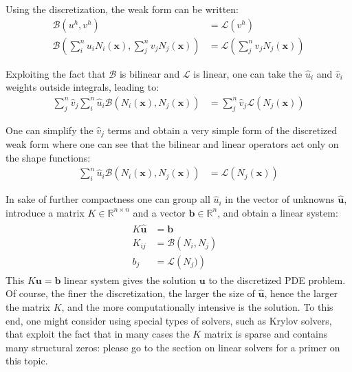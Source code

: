 \documentclass{digitaldynamics}
\def\vect#1{\bm{#1}}
\def\matr#1{{#1}}
\begin{document}
Using the discretization, the weak form can be written:
\begin{align}
\mathcal{B}(u^h,v^h) &= \mathcal{L}(v^h) \\
\mathcal{B}\left(\sum_i^n u_i N_i(\vect{x}),\sum_j^n v_j N_j(\vect{x})\right) &= \mathcal{L}\left(\sum_j^n v_j N_j(\vect{x})\right)
\end{align}

Exploiting the fact that $\mathcal{B}$ is bilinear and $\mathcal{L}$ is linear, one can take the $\hat{u}_i$ and $\hat{v}_i$ weights outside integrals, leading to:
\begin{align}
\sum_j^n \hat{v}_j \sum_i^n \hat{u}_i \mathcal{B}\left(N_i(\vect{x}),N_j(\vect{x})\right) &= \sum_j^n \hat{v}_j \mathcal{L}\left( N_j(\vect{x})\right)
\end{align}

One can simplify the $\hat{v}_j$ terms and obtain a very simple form of the discretized weak form where one can see that the bilinear and linear operators act only on the shape functions:
\begin{align}
\sum_i^n \hat{u}_i \mathcal{B}\left(N_i(\vect{x}),N_j(\vect{x})\right) &= \mathcal{L}\left( N_j(\vect{x})\right)
\end{align}

In sake of further compactness one can group all $\hat{u}_i$ in the vector of unknowns $\hat{\vect{u}}$, introduce a matrix $\matr{K} \in \mathbb{R}^{n\times n}$ and a vector $\vect{b} \in \mathbb{R}^{n}$, and obtain a linear system: 
\begin{align}
\boxed{
\begin{aligned}
\matr{K} \hat{\vect{u}}  &= \vect{b} & \\[2mm]
 K_{ij}   &=  \mathcal{B}\left(N_i,N_j \right) \\
 b_j &=  \mathcal{L}\left( N_j )\right)
\end{aligned}
}
\end{align}
This $\matr{K} \vect{u} = \vect{b}$ linear system gives the solution $\vect{u}$ to the discretized PDE problem. Of course, the finer the discretization, the larger the size of $\hat{\vect{u}}$, hence the larger the matrix $\matr{K}$, and the more computationally intensive is the solution. To this end, one might consider using special types of solvers, such as Krylov solvers, that exploit the fact that in many cases the $\matr{K}$ matrix is sparse and contains many structural zeros: please go to the section on linear solvers for a primer on this topic. 
\end{document}
